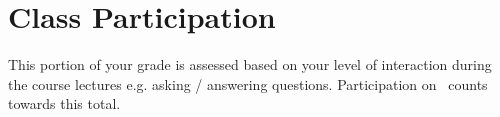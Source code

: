 \section*{Class Participation}

This portion of your grade is assessed based on your level of interaction during the course lectures e.g. asking / answering questions. Participation on \discordlink~counts towards this total.